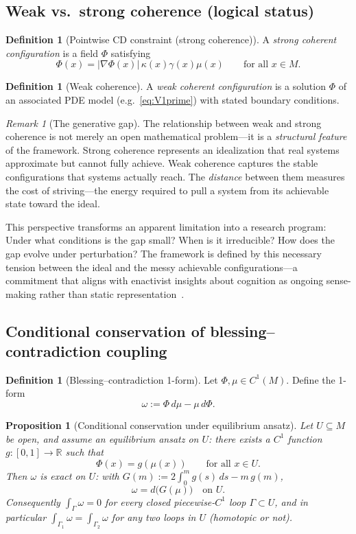 \documentclass[11pt]{article}
\theoremstyle{plain}
\newtheorem{proposition}[theorem]{Proposition}
\theoremstyle{definition}
\newtheorem{definition}[theorem]{Definition}
\theoremstyle{remark}
\newtheorem{remark}[theorem]{Remark}
\newcommand{\R}{\mathbb{R}}
\newcommand{\abs}[1]{\left\lvert #1\right\rvert}
\begin{document}
\subsection{Weak vs.\ strong coherence (logical status)}
\begin{definition}[Pointwise CD constraint (strong coherence)]
A \emph{strong coherent configuration} is a field \(\Phi\) satisfying
\[
\Phi(x) = \abs{\nabla \Phi(x)}\,\kappa(x)\gamma(x)\mu(x)\qquad\text{for all }x\in M.
\]
\end{definition}

\begin{definition}[Weak coherence]
A \emph{weak coherent configuration} is a solution \(\Phi\) of an associated PDE model (e.g.\ \eqref{eq:V1prime}) with stated boundary conditions.
\end{definition}

\begin{remark}[The generative gap]\label{rem:generativeGap}
The relationship between weak and strong coherence is not merely an open mathematical problem---it is a \emph{structural feature} of the framework. Strong coherence represents an idealization that real systems approximate but cannot fully achieve. Weak coherence captures the stable configurations that systems actually reach. The \emph{distance} between them measures the cost of striving---the energy required to pull a system from its achievable state toward the ideal.

This perspective transforms an apparent limitation into a research program: Under what conditions is the gap small? When is it irreducible? How does the gap evolve under perturbation? The framework is defined by this necessary tension between the ideal and the messy achievable configurations---a commitment that aligns with enactivist insights about cognition as ongoing sense-making rather than static representation~\cite{Thompson2007}.
\end{remark}

\subsection{Conditional conservation of blessing--contradiction coupling}
\begin{definition}[Blessing--contradiction 1-form]
Let \(\Phi,\mu\in C^1(M)\). Define the 1-form
\[
\omega := \Phi\,d\mu - \mu\,d\Phi.
\]
\end{definition}

\begin{proposition}[Conditional conservation under equilibrium ansatz]\label{prop:conservation}
Let \(U\subseteq M\) be open, and assume an \emph{equilibrium ansatz} on \(U\): there exists a \(C^1\) function \(g:[0,1]\to\R\) such that
\[
\Phi(x)=g(\mu(x))\qquad\text{for all }x\in U.
\]
Then \(\omega\) is exact on \(U\): with \(G(m):=2\int_0^m g(s)\,ds-m\,g(m)\),
\[
\omega = d\big(G(\mu)\big)\quad\text{on }U .
\]
Consequently \(\int_\Gamma\omega=0\) for every closed piecewise-\(C^1\) loop \(\Gamma\subset U\), and in particular \(\int_{\Gamma_1}\omega=\int_{\Gamma_2}\omega\) for any two loops in \(U\) (homotopic or not).
\end{proposition}
\end{document}
